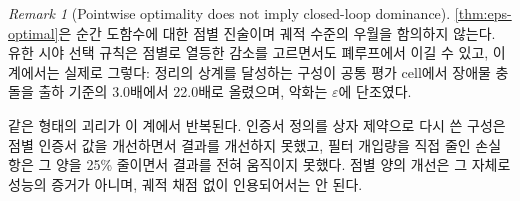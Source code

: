 \documentclass[11pt]{article}
\theoremstyle{plain}
\theoremstyle{definition}
\theoremstyle{remark}
\newtheorem{remark}[theorem]{Remark}
\begin{document}
\begin{remark}[Pointwise optimality does not imply closed-loop dominance]\label{rem:pointwise-not-closed-loop}
\cref{thm:eps-optimal}은 순간 도함수에 대한 점별 진술이며 궤적 수준의 우월을
함의하지 않는다. 유한 시야 선택 규칙은 점별로 열등한 감소를 고르면서도 폐루프에서
이길 수 있고, 이 계에서는 실제로 그렇다: 정리의 상계를 달성하는 구성이 공통
평가 cell에서 장애물 충돌을 출하 기준의 3.0배에서 22.0배로 올렸으며, 악화는
$\varepsilon$에 단조였다.

같은 형태의 괴리가 이 계에서 반복된다. 인증서 정의를 상자 제약으로 다시 쓴
구성은 점별 인증서 값을 개선하면서 결과를 개선하지 못했고, 필터 개입량을
직접 줄인 손실 항은 그 양을 25\% 줄이면서 결과를 전혀 움직이지 못했다.
점별 양의 개선은 그 자체로 성능의 증거가 아니며, 궤적 채점 없이 인용되어서는
안 된다.
\end{remark}
\end{document}
